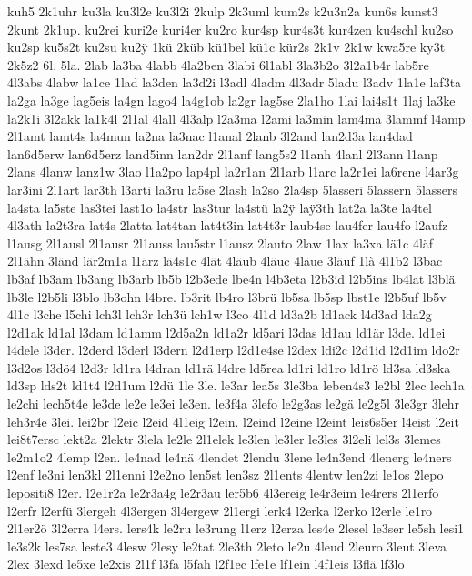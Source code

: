 {kuh5
2k1uhr
ku3la
ku3l2e
ku3l2i
2kulp
2k3uml
kum2s
k2u3n2a
kun6s
kunst3
2kunt
2k1up.
ku2rei
kuri2e
kuri4er
ku2ro
kur4sp
kur4s3t
kur4zen
ku4schl
ku2so
ku2sp
ku5s2t
ku2su
ku2^^ff
1kü
2küb
kü1bel
kü1c
kür2s
2k1v
2k1w
kwa5re
ky3t
2k5z2
6l.
5la.
2lab
la3ba
4labb
4la2ben
3labi
6l1abl
3la3b2o
3l2a1b4r
lab5re
4l3abs
4labw
la1ce
1lad
la3den
la3d2i
l3adl
4ladm
4l3adr
5ladu
l3adv
1la1e
laf3ta
la2ga
la3ge
lag5eis
la4gn
lago4
la4g1ob
la2gr
lag5se
2la1ho
1lai
lai4s1t
1laj
la3ke
la2k1i
3l2akk
la1k4l
2l1al
4lall
4l3alp
l2a3ma
l2ami
la3min
lam4ma
3lammf
l4amp
2l1amt
lamt4s
la4mun
la2na
la3nac
l1anal
2lanb
3l2and
lan2d3a
lan4dad
lan6d5erw
lan6d5erz
land5inn
lan2dr
2l1anf
lang5s2
l1anh
4lanl
2l3ann
l1anp
2lans
4lanw
lanz1w
3lao
l1a2po
lap4pl
la2r1an
2l1arb
l1arc
la2r1ei
la6rene
l4ar3g
lar3ini
2l1art
lar3th
l3arti
la3ru
la5se
2lash
la2so
2la4sp
5lasseri
5lassern
5lassers
la4sta
la5ste
las3tei
last1o
la4str
las3tur
la4stü
la2^^ff
la^^ff3th
lat2a
la3te
la4tel
4l3ath
la2t3ra
lat4s
2latta
lat4tan
lat4t3in
lat4t3r
laub4se
lau4fer
lau4fo
l2aufz
l1ausg
2l1ausl
2l1ausr
2l1auss
lau5str
l1ausz
2lauto
2law
1lax
la3xa
lä1c
4läf
2l1ähn
3länd
lär2m1a
l1ärz
lä4s1c
4lät
4läub
4läuc
4läue
3läuf
1là
4l1b2
l3bac
lb3af
lb3am
lb3ang
lb3arb
lb5b
l2b3ede
lbe4n
l4b3eta
l2b3id
l2b5ins
lb4lat
l3blä
lb3le
l2b5li
l3blo
lb3ohn
l4bre.
lb3rit
lb4ro
l3brü
lb5sa
lb5sp
lbst1e
l2b5uf
lb5v
4l1c
l3che
l5chi
lch3l
lch3r
lch3ü
lch1w
l3co
4l1d
ld3a2b
ld1ack
l4d3ad
lda2g
l2d1ak
ld1al
l3dam
ld1amm
l2d5a2n
ld1a2r
ld5ari
l3das
ld1au
ld1är
l3de.
ld1ei
l4dele
l3der.
l2derd
l3derl
l3dern
l2d1erp
l2d1e4se
l2dex
ldi2c
l2d1id
l2d1im
ldo2r
l3d2os
l3dö4
l2d3r
ld1ra
l4dran
ld1rä
l4dre
ld5rea
ld1ri
ld1ro
ld1rö
ld3sa
ld3ska
ld3sp
lds2t
ld1t4
l2d1um
l2dü
1le
3le.
le3ar
lea5s
3le3ba
leben4s3
le2bl
2lec
lech1a
le2chi
lech5t4e
le3de
le2e
le3ei
le3en.
le3f4a
3lefo
le2g3as
le2gä
le2g5l
3le3gr
3lehr
leh3r4e
3lei.
lei2br
l2eic
l2eid
4l1eig
l2ein.
l2eind
l2eine
l2eint
leis6s5er
l4eist
l2eit
lei8t7ersc
lekt2a
2lektr
3lela
le2le
2l1elek
le3len
le3ler
le3les
3l2eli
lel3s
3lemes
le2m1o2
4lemp
l2en.
le4nad
le4nä
4lendet
2lendu
3lene
le4n3end
4lenerg
le4ners
l2enf
le3ni
len3kl
2l1enni
l2e2no
len5st
len3sz
2l1ents
4lentw
len2zi
le1os
2lepo
lepositi8
l2er.
l2e1r2a
le2r3a4g
le2r3au
ler5b6
4l3ereig
le4r3eim
le4rers
2l1erfo
l2erfr
l2erfü
3lergeh
4l3ergen
3l4ergew
2l1ergi
lerk4
l2erka
l2erko
l2erle
le1ro
2l1er2ö
3l2erra
l4ers.
lers4k
le2ru
le3rung
l1erz
l2erza
les4e
2lesel
le3ser
le5sh
lesi1
le3s2k
les7sa
leste3
4lesw
2lesy
le2tat
2le3th
2leto
le2u
4leud
2leuro
3leut
3leva
2lex
3lexd
le5xe
le2xis
2l1f
l3fa
l5fah
l2f1ec
lfe1e
lf1ein
l4f1eis
l3flä
lf3lo
}
